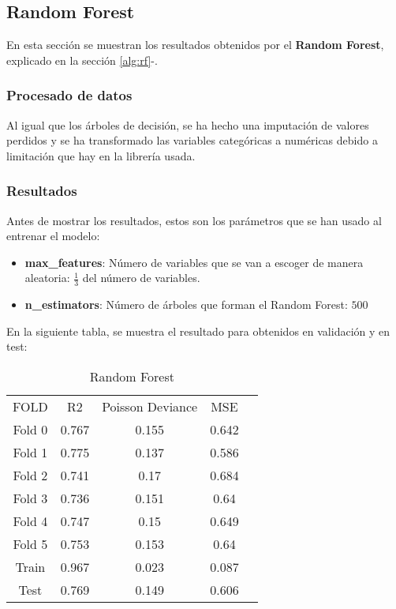 \subsection{Random Forest}
En esta sección se muestran los resultados obtenidos por el \textbf{Random Forest}, explicado en la sección \ref{alg:rf}-.
\subsubsection*{Procesado de datos}
Al igual que los árboles de decisión, se ha hecho una imputación de valores perdidos y se ha transformado las variables categóricas a numéricas debido a limitación que hay en la librería usada.
\pagebreak
\subsubsection*{Resultados}
Antes de mostrar los resultados, estos son los parámetros que se han usado al entrenar el modelo:
\begin{itemize}
	\item \textbf{max\_features}: Número de variables que se van a escoger de manera aleatoria: $\frac{1}{3}$ del número de variables.
	      \item\textbf{n\_estimators}: Número de árboles que forman el Random Forest: $500$
\end{itemize}
En la siguiente tabla, se muestra el resultado para obtenidos en validación y en test:
\linebreak
\begin{table}[H]
	\centering
	\begin{tabular}{|c|c|c|c|c}
		\cline{1-4}
		FOLD   & R2    & Poisson Deviance & MSE   \\ \cline{1-4}
		Fold 0 & 0.767 & 0.155            & 0.642 \\ \cline{1-4}
		Fold 1 & 0.775 & 0.137            & 0.586 \\ \cline{1-4}
		Fold 2 & 0.741 & 0.17             & 0.684 \\ \cline{1-4}
		Fold 3 & 0.736 & 0.151            & 0.64  \\ \cline{1-4}
		Fold 4 & 0.747 & 0.15             & 0.649 \\ \cline{1-4}
		Fold 5 & 0.753 & 0.153            & 0.64  \\ \cline{1-4}
		Train  & 0.967 & 0.023            & 0.087 \\ \cline{1-4}
		Test   & 0.769 & 0.149            & 0.606 \\ \cline{1-4}
	\end{tabular}
	\caption{Random Forest}
	\label{tab:res_random_forest}
\end{table}
